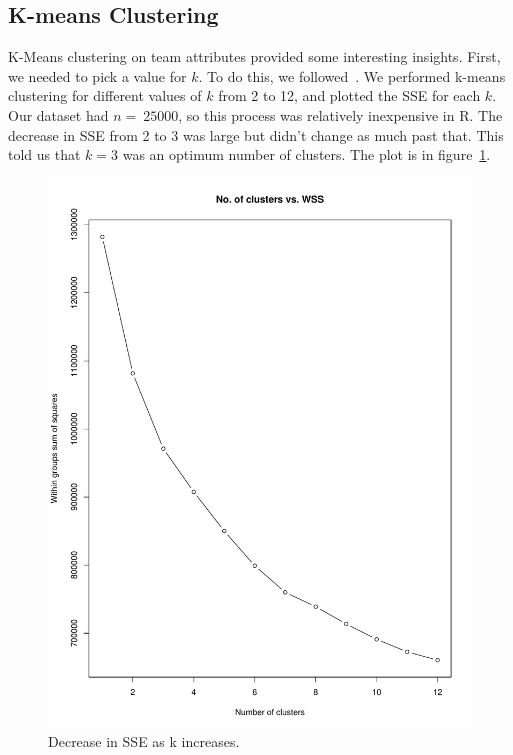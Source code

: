 \documentclass[11pt]{article}
\begin{document}
\subsection{K-means Clustering}
K-Means clustering on team attributes provided some interesting insights.
First, we needed to pick a value for $k$.
To do this, we followed~\cite{cluster1}.
We performed k-means clustering for different values of $k$ from 2 to 12, and plotted the SSE for each $k$.
Our dataset had $n = ~25000$, so this process was relatively inexpensive in R.
The decrease in SSE from 2 to 3 was large but didn't change as much past that.
This told us that $k=3$ was an optimum number of clusters.
The plot is in figure~\ref{fig:sse}.

\begin{figure}[ht!]
  \centering
  \includegraphics[scale=0.5]{wss}
  \caption{Decrease in SSE as k increases.}
  \label{fig:sse}
\end{figure}
\end{document}
